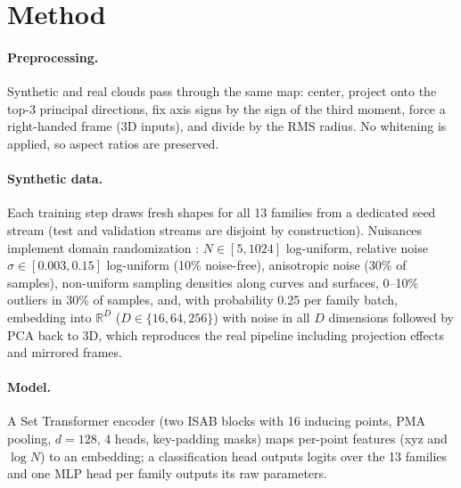 \documentclass[10pt]{article}
\begin{document}


\section{Method}
\label{sec:method}
\paragraph{Preprocessing.} Synthetic and real clouds pass through the same map: center, project onto the top-3 principal directions, fix axis signs by the sign of the third moment, force a right-handed frame (3D inputs), and divide by the RMS radius. No whitening is applied, so aspect ratios are preserved.

\paragraph{Synthetic data.} Each training step draws fresh shapes for all 13 families from a dedicated seed stream (test and validation streams are disjoint by construction). Nuisances implement domain randomization \citep{tobin2017domain}: $N\in[5,1024]$ log-uniform, relative noise $\sigma\in[0.003,0.15]$ log-uniform (10\% noise-free), anisotropic noise (30\% of samples), non-uniform sampling densities along curves and surfaces, 0--10\% outliers in 30\% of samples, and, with probability 0.25 per family batch, embedding into $\mathbb{R}^D$ ($D\in\{16,64,256\}$) with noise in all $D$ dimensions followed by PCA back to 3D, which reproduces the real pipeline including projection effects and mirrored frames.

\paragraph{Model.} A Set Transformer encoder \citep{lee2019settransformer} (two ISAB blocks with 16 inducing points, PMA pooling, $d=128$, 4 heads, key-padding masks) maps per-point features (xyz and $\log N$) to an embedding; a classification head outputs logits over the 13 families and one MLP head per family outputs its raw parameters.
\end{document}
